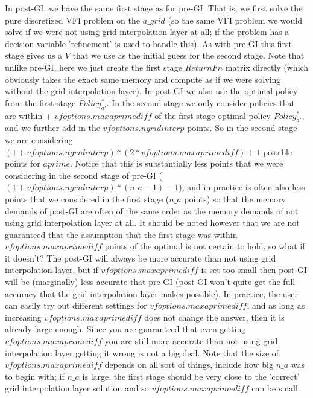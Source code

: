 \documentclass[11pt,fleqn]{article}
\begin{document}
In post-GI, we have the same first stage as for pre-GI. That is, we first solve the pure discretized VFI problem on the $a\_{}grid$ (so the same VFI problem we would solve if we were not using grid interpolation layer at all; if the problem has a decision variable 'refinement' is used to handle this). As with pre-GI this first stage gives us a $V$ that we use as the initial guess for the second stage. Note that unlike pre-GI, here we just create the first stage $ReturnFn$ matrix directly (which obviously takes the exact same memory and compute as if we were solving without the grid interpolation layer). In post-GI we also use the optimal policy from the first stage $Policy_{a'}^*$. In the second stage we only consider policies that are within +-$vfoptions.maxaprimediff$ of the first stage optimal policy $Policy_{a'}^*$, and we further add in the $vfoptions.ngridinterp$ points. So in the second stage we are considering $(1+vfoptions.ngridinterp)*(2*vfoptions.maxaprimediff)+1$ possible points for $aprime$. Notice that this is substantially less points that we were considering in the second stage of pre-GI ($(1+vfoptions.ngridinterp)*(n\_{}a-1)+1$), and in practice is often also less points that we considered in the first stage ($n\_{}a$ points) so that the memory demands of post-GI are often of the same order as the memory demands of not using grid interpolation layer at all. It should be noted however that we are not guaranteed that the assumption that the first-stage was within $vfoptions.maxaprimediff$ points of the optimal is not certain to hold, so what if it doesn't? The post-GI will always be more accurate than not using grid interpolation layer, but if $vfoptions.maxaprimediff$ is set too small then post-GI will be (marginally) less accurate that pre-GI (post-GI won't quite get the full accuracy that the grid interpolation layer makes possible). In practice, the user can easily try out different settings for $vfoptions.maxaprimediff$, and as long as increasing $vfoptions.maxaprimediff$ does not change the answer, then it is already large enough. Since you are guaranteed that even getting $vfoptions.maxaprimediff$ you are still more accurate than not using grid interpolation layer getting it wrong is not a big deal. Note that the size of $vfoptions.maxaprimediff$ depends on all sort of things, include how big $n\_{}a$ was to begin with; if $n\_{}a$ is large, the first stage should be very close to the 'correct' grid interpolation layer solution and so $vfoptions.maxaprimediff$ can be small.



\nocite{VFIToolkit}




\newpage
\appendix
\label{sec:appendix}
\end{document}
